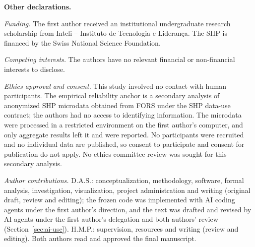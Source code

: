 \noindent\textbf{Other declarations.}

\noindent\emph{Funding.} The first author received an institutional undergraduate research scholarship from Inteli -- Instituto de Tecnologia e Liderança. The SHP is financed by the Swiss National Science Foundation.

\noindent\emph{Competing interests.} The authors have no relevant financial or non-financial interests to disclose.

\noindent\emph{Ethics approval and consent.} This study involved no contact with human participants. The empirical reliability anchor is a secondary analysis of anonymized SHP microdata obtained from FORS under the SHP data-use contract; the authors had no access to identifying information. The microdata were processed in a restricted environment on the first author's computer, and only aggregate results left it and were reported. No participants were recruited and no individual data are published, so consent to participate and consent for publication do not apply. No ethics committee review was sought for this secondary analysis.

\noindent\emph{Author contributions.} D.A.S.: conceptualization, methodology, software, formal analysis, investigation, visualization, project administration and writing (original draft, review and editing); the frozen code was implemented with AI coding agents under the first author's direction, and the text was drafted and revised by AI agents under the first author's delegation and both authors' review (Section~\ref{sec:ai-use}). H.M.P.: supervision, resources and writing (review and editing). Both authors read and approved the final manuscript.
